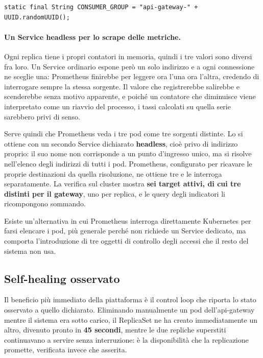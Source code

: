 \documentclass[12pt,a4paper]{article}
\begin{document}
\begin{lstlisting}[caption={Un gruppo per istanza, non per servizio}]
static final String CONSUMER_GROUP = "api-gateway-" + UUID.randomUUID();
\end{lstlisting}

\paragraph{Un Service headless per lo scrape delle metriche.} Ogni replica tiene i propri contatori
in memoria, quindi i tre valori sono diversi fra loro. Un Service ordinario espone per\`o un solo
indirizzo e a ogni connessione ne sceglie una: Prometheus finirebbe per leggere ora l'una ora
l'altra, credendo di interrogare sempre la stessa sorgente. Il valore che registrerebbe salirebbe e
scenderebbe senza motivo apparente, e poich\'e un contatore che diminuisce viene interpretato come un
riavvio del processo, i tassi calcolati su quella serie sarebbero privi di senso.

Serve quindi che Prometheus veda i tre pod come tre sorgenti distinte. Lo si ottiene con un secondo
Service dichiarato \textbf{headless}, cio\`e privo di indirizzo proprio: il suo nome non corrisponde
a un punto d'ingresso unico, ma si risolve nell'elenco degli indirizzi di tutti i pod. Prometheus,
configurato per ricavare le proprie destinazioni da quella risoluzione, ne ottiene tre e le
interroga separatamente. La verifica sul cluster mostra \textbf{sei target attivi, di cui tre
distinti per il gateway}, uno per replica, e le query degli indicatori li ricompongono sommando.

Esiste un'alternativa in cui Prometheus interroga direttamente Kubernetes per farsi elencare i pod,
pi\`u generale perch\'e non richiede un Service dedicato, ma comporta l'introduzione di tre oggetti
di controllo degli accessi che il resto del sistema non usa.

\subsection{Self-healing osservato}

Il beneficio pi\`u immediato della piattaforma \`e il control loop che riporta lo stato osservato a
quello dichiarato. Eliminando manualmente un pod dell'api-gateway mentre il sistema era sotto
carico, il ReplicaSet ne ha creato immediatamente un altro, divenuto pronto in \textbf{45 secondi},
mentre le due repliche superstiti continuavano a servire senza interruzione: \`e la
disponibilit\`a che la replicazione promette, verificata invece che asserita.
\end{document}
